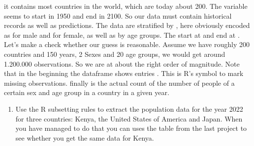\documentclass[letterpaper,10pt,english]{jupyterBook}
\begin{document}
it contains most countries in the world, which are today about 200. The  variable seems to start in 1950 and end in 2100. So our data must contain historical records as well as predictions. The data are stratified by , here obviously encoded as  for male and  for female, as well as by age groups. The start at and end at . Let’s make a check whether our guess is reasonable. Assume we have roughly 200 countries and 150 years, 2 Sexes and 20 age groups, we would get around 1.200.000 observations. So we are at about the right order of magnitude. Note that in the beginning the dataframe shows entries . This is R’s symbol to mark missing observations. finally is the actual count of the number of people of a certain sex and age group in a country in a given year.
\begin{enumerate}
%
\item {} 
\sphinxAtStartPar
Use the R subsetting rules to extract the population data for the year 2022 for three countries: Kenya, the
United States of America and Japan. When you have managed to do that you can uses the table
from the last   project to see whether you get the same data for Kenya.

\end{enumerate}
\end{document}
